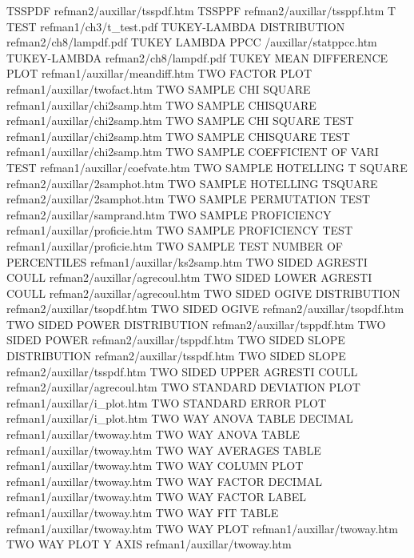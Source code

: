 TSSPDF                                  refman2/auxillar/tsspdf.htm
TSSPPF                                  refman2/auxillar/tssppf.htm
T TEST                                  refman1/ch3/t_test.pdf
TUKEY-LAMBDA DISTRIBUTION               refman2/ch8/lampdf.pdf
TUKEY LAMBDA PPCC                       /auxillar/statppcc.htm
TUKEY-LAMBDA                            refman2/ch8/lampdf.pdf
TUKEY MEAN DIFFERENCE PLOT              refman1/auxillar/meandiff.htm
TWO FACTOR PLOT                         refman1/auxillar/twofact.htm
TWO SAMPLE CHI SQUARE                   refman1/auxillar/chi2samp.htm
TWO SAMPLE CHISQUARE                    refman1/auxillar/chi2samp.htm
TWO SAMPLE CHI SQUARE TEST              refman1/auxillar/chi2samp.htm
TWO SAMPLE CHISQUARE TEST               refman1/auxillar/chi2samp.htm
TWO SAMPLE COEFFICIENT OF VARI TEST     refman1/auxillar/coefvate.htm
TWO SAMPLE HOTELLING T SQUARE           refman2/auxillar/2samphot.htm
TWO SAMPLE HOTELLING TSQUARE            refman2/auxillar/2samphot.htm
TWO SAMPLE PERMUTATION TEST             refman2/auxillar/samprand.htm
TWO SAMPLE PROFICIENCY                  refman1/auxillar/proficie.htm
TWO SAMPLE PROFICIENCY TEST             refman1/auxillar/proficie.htm
TWO SAMPLE TEST NUMBER OF PERCENTILES   refman1/auxillar/ks2samp.htm
TWO SIDED AGRESTI COULL                 refman2/auxillar/agrecoul.htm
TWO SIDED LOWER AGRESTI COULL           refman2/auxillar/agrecoul.htm
TWO SIDED OGIVE DISTRIBUTION            refman2/auxillar/tsopdf.htm
TWO SIDED OGIVE                         refman2/auxillar/tsopdf.htm
TWO SIDED POWER DISTRIBUTION            refman2/auxillar/tsppdf.htm
TWO SIDED POWER                         refman2/auxillar/tsppdf.htm
TWO SIDED SLOPE DISTRIBUTION            refman2/auxillar/tsspdf.htm
TWO SIDED SLOPE                         refman2/auxillar/tsspdf.htm
TWO SIDED UPPER AGRESTI COULL           refman2/auxillar/agrecoul.htm
TWO STANDARD DEVIATION PLOT             refman1/auxillar/i_plot.htm
TWO STANDARD ERROR PLOT                 refman1/auxillar/i_plot.htm
TWO WAY ANOVA TABLE DECIMAL             refman1/auxillar/twoway.htm
TWO WAY ANOVA TABLE                     refman1/auxillar/twoway.htm
TWO WAY AVERAGES TABLE                  refman1/auxillar/twoway.htm
TWO WAY COLUMN PLOT                     refman1/auxillar/twoway.htm
TWO WAY FACTOR DECIMAL                  refman1/auxillar/twoway.htm
TWO WAY FACTOR LABEL                    refman1/auxillar/twoway.htm
TWO WAY FIT TABLE                       refman1/auxillar/twoway.htm
TWO WAY PLOT                            refman1/auxillar/twoway.htm
TWO WAY PLOT Y AXIS                     refman1/auxillar/twoway.htm
